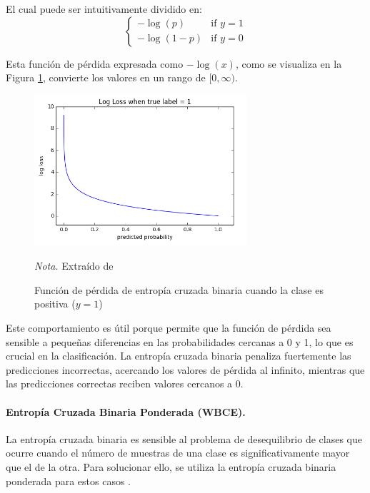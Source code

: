El cual puede ser intuitivamente dividido en:
\[
\begin{cases}
    -\log(p) & \text{if  } y = 1 \\
    -\log(1 - p) & \text{if  } y = 0
\end{cases}
\]

Esta función de pérdida expresada como $-\log(x)$, como se visualiza en la Figura \ref{fig:cross_entropy}, convierte los valores en 
un rango de $[0, \infty)$.

\begin{figure}[H]
    \centering
    \caption{Función de pérdida de entropía cruzada binaria cuando la clase es positiva ($y = 1$)}
    \includegraphics[width=0.7\textwidth]{img/4_marco_teorico/cross_entropy.png}
    \label{fig:cross_entropy}
    \begin{flushleft}
        \textit{Nota.} Extraído de \citet{machine_learning_glossary_loss_2017} 
        \vspace{-\baselineskip}       
    \end{flushleft}
\end{figure}

Este comportamiento es útil porque permite que la función de pérdida sea sensible a pequeñas diferencias en las probabilidades cercanas 
a 0 y 1, lo que es crucial en la clasificación. La entropía cruzada binaria penaliza fuertemente las predicciones incorrectas, acercando 
los valores de pérdida al infinito, mientras que las predicciones correctas reciben valores cercanos a 0. 

\paragraph{Entropía Cruzada Binaria Ponderada (WBCE).}
La entropía cruzada binaria es sensible al problema de desequilibrio de clases que ocurre
cuando el número de muestras de una clase es significativamente mayor que el de la otra. Para solucionar ello, se utiliza la entropía cruzada 
binaria ponderada para estos casos \citep{terven_loss_2024}.

